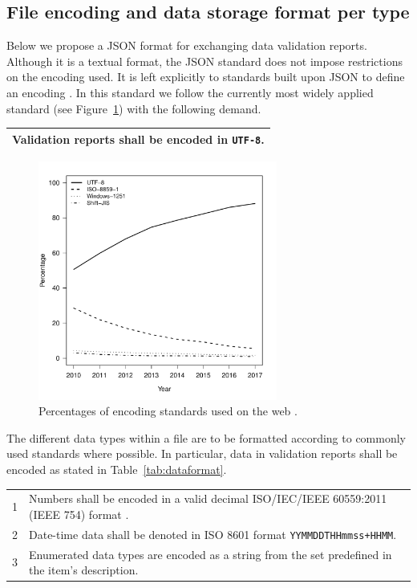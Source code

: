 \documentclass[a4paper, 11pt,titlepage]{article}
\newcommand{\code}[1]{\texttt{#1}}
\begin{document}
\subsection{File encoding and data storage format per type}
Below we propose a JSON format \citep{ecma2013json} for exchanging data
validation reports.  Although it is a textual format, the JSON standard does
not impose restrictions on the encoding used. It is left explicitly to
standards built upon JSON to define an encoding \citep[pp ii]{ecma2013json}. In
this standard we follow the currently most widely applied standard (see
Figure~\ref{fig:encoding}) with the following demand.

\begin{center}
\label{tab:encoding}
\begin{tabular}{|p{}|}
\hline
Validation reports shall be encoded in \code{UTF-8}.\\
\hline
\end{tabular}
\end{center}

\begin{figure}[t]
\centering
\includegraphics[width=0.7\textwidth]{fig/encoding_use.pdf}
\caption{Percentages of encoding standards used on the web \citep{w3techs2017}.}
\label{fig:encoding}
\end{figure}

The different data types within a file are to be formatted according to
commonly used standards where possible. In particular, data in validation
reports shall be encoded as stated in Table~\ref{tab:dataformat}.
\begin{center}
\begin{tabular}{|lp{}|}
\hline
1&Numbers shall be encoded in a valid decimal ISO/IEC/IEEE 60559:2011 (IEEE 754) format
\citep{ieee:2008}. \\
2&Date-time data shall be denoted in ISO 8601 format \code{YYMMDDTHHmmss+HHMM}. \\
3&Enumerated data types are encoded as a string from the set predefined in the item's description.\\
\hline
\end{tabular}
\label{tab:dataformat}
\end{center}
\end{document}
